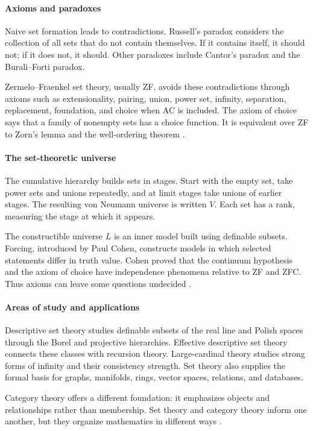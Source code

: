 \paragraph{Axioms and paradoxes}
Naive set formation leads to contradictions. Russell's paradox considers the collection of all sets that do not contain themselves. If it contains itself, it should not; if it does not, it should. Other paradoxes include Cantor's paradox and the Burali--Forti paradox.

Zermelo--Fraenkel set theory, usually ZF, avoids these contradictions through axioms such as extensionality, pairing, union, power set, infinity, separation, replacement, foundation, and choice when AC is included. The axiom of choice says that a family of nonempty sets has a choice function. It is equivalent over ZF to Zorn's lemma and the well-ordering theorem \cite{set_ref1}.

\paragraph{The set-theoretic universe}
The cumulative hierarchy builds sets in stages. Start with the empty set, take power sets and unions repeatedly, and at limit stages take unions of earlier stages. The resulting von Neumann universe is written $V$. Each set has a rank, measuring the stage at which it appears.

The constructible universe $L$ is an inner model built using definable subsets. Forcing, introduced by Paul Cohen, constructs models in which selected statements differ in truth value. Cohen proved that the continuum hypothesis and the axiom of choice have independence phenomena relative to ZF and ZFC. Thus axioms can leave some questions undecided \cite{set_ref4}.

\paragraph{Areas of study and applications}
Descriptive set theory studies definable subsets of the real line and Polish spaces through the Borel and projective hierarchies. Effective descriptive set theory connects these classes with recursion theory. Large-cardinal theory studies strong forms of infinity and their consistency strength. Set theory also supplies the formal basis for graphs, manifolds, rings, vector spaces, relations, and databases.

Category theory offers a different foundation: it emphasizes objects and relationships rather than membership. Set theory and category theory inform one another, but they organize mathematics in different ways \cite{set_ref5}.

